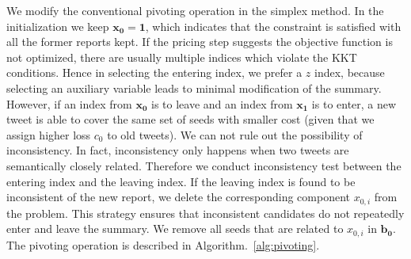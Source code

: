 \documentclass[envcountsame]{llncs}
\begin{document}
We modify the conventional pivoting operation in the simplex method. In the initialization we keep $\mathbf{x_0}=\mathbf{1}$, which indicates that the constraint is satisfied with all the former reports kept. If the pricing step suggests the objective function is not optimized, there are usually multiple indices which violate the KKT conditions.  Hence in selecting the entering index, we prefer a $z$ index, because selecting an auxiliary variable leads to minimal modification of the summary. However, if an index from $\mathbf{x_0}$ is to leave and an index from $\mathbf{x_1}$ is to enter, a new tweet is able to cover the same set of seeds with smaller cost (given that we assign higher loss $c_0$ to old tweets). We can not rule out the possibility of inconsistency. In fact, inconsistency only happens when two tweets are semantically closely related. Therefore we conduct inconsistency test between the entering index and the leaving index. If the leaving index is found to be inconsistent of the new report, we delete the corresponding component $x_{0,i}$ from the problem. This strategy ensures that inconsistent candidates do not repeatedly enter and leave the summary. We remove all seeds that are related to $x_{0,i}$ in $\mathbf{b_0}$. The pivoting operation is described in Algorithm.~\ref{alg:pivoting}.
\end{document}
